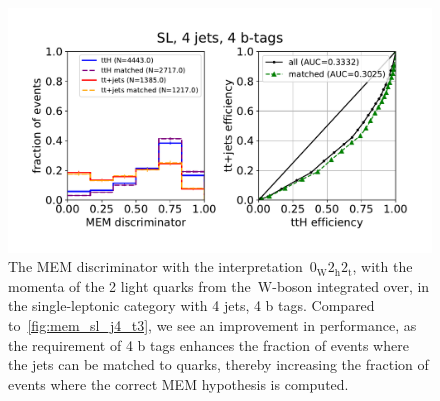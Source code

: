 \begin{figure}
\begin{centering}
\includegraphics[width = 1.0\textwidth]{figures/mem_sl_j4_t4.pdf}
\caption{The MEM discriminator with the interpretation~$0_{\mathrm{W}} 2_{\mathrm{h}} 2_{\mathrm{t}}$, with the momenta of the 2 light quarks from the~$\mathrm{W}$-boson integrated over, in the single-leptonic category with 4 jets, 4 b tags. Compared to~\cref{fig:mem_sl_j4_t3}, we see an improvement in performance, as the requirement of 4 b tags enhances the fraction of events where the jets can be matched to quarks, thereby increasing the fraction of events where the correct MEM hypothesis is computed.}
\label{fig:mem_sl_j4_t4}
\end{centering}
\end{figure}

